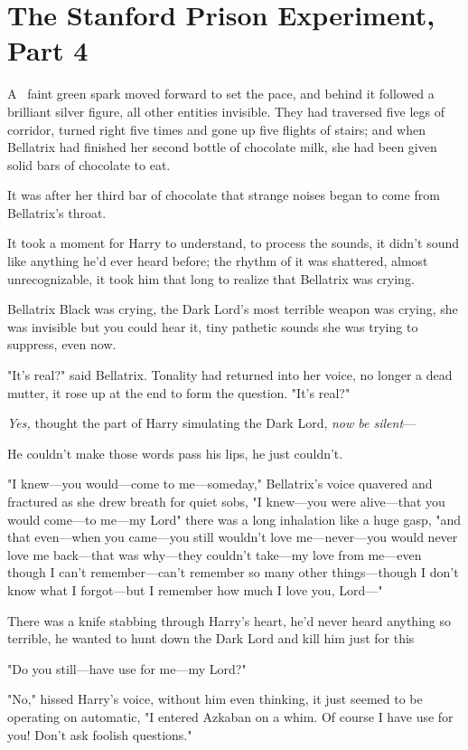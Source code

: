 \chapter{The Stanford Prison Experiment, Part 4}

\lettrine{A}{~} faint green
spark moved forward to set the pace, and behind it followed a brilliant silver
figure, all other entities invisible. They had traversed five legs of corridor,
turned right five times and gone up five flights of stairs; and when Bellatrix
had finished her second bottle of chocolate milk, she had been given solid bars
of chocolate to eat.

It was after her third bar of chocolate that strange noises began to come from
Bellatrix's throat.

It took a moment for Harry to understand, to process the sounds, it didn't
sound like anything he'd ever heard before; the rhythm of it was shattered,
almost unrecognizable, it took him that long to realize that Bellatrix was
crying.

Bellatrix Black was crying, the Dark Lord's most terrible weapon was crying,
she was invisible but you could hear it, tiny pathetic sounds she was trying to
suppress, even now.

"It's real?" said Bellatrix. Tonality had returned into her voice, no longer a
dead mutter, it rose up at the end to form the question. "It's real?"

\emph{Yes,} thought the part of Harry simulating the Dark Lord, \emph{now be
silent}—

He couldn't make those words pass his lips, he just couldn't.

"I knew—you would—come to me—someday," Bellatrix's voice quavered and
fractured as she drew breath for quiet sobs, "I knew—you were alive—that
you would come—to me—my Lord{\el}" there was a long inhalation like a
huge gasp, "and that even—when you came—you still wouldn't love
me—never—you would never love me back—that was why—they couldn't
take—my love from me—even though I can't remember—can't remember so many
other things—though I don't know what I forgot—but I remember how much I
love you, Lord—"

There was a knife stabbing through Harry's heart, he'd never heard anything so
terrible, he wanted to hunt down the Dark Lord and kill him just for
this{\el}

"Do you still—have use for me—my Lord?"

"No," hissed Harry's voice, without him even thinking, it just seemed to be
operating on automatic, "I entered Azkaban on a whim. Of course I have use for
you! Don't ask foolish questions."

